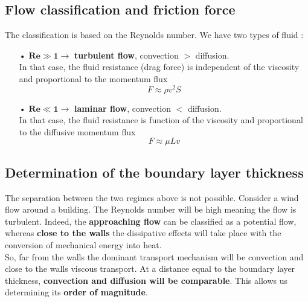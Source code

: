 \subsection{Flow classification and friction force}
The classification is based on the Reynolds number. We have two types of fluid : \\
	
\begin{itemize}
	\item[•] $\mathbf{Re \gg 1 \rightarrow}$ \textbf{turbulent flow}, convection $>$ diffusion. \\
	      In that case, the fluid resistance (drag force) is independent of the viscosity and proportional to the momentum flux 
	      \begin{equation}
	      	F \approx \rho v^2 S
	      \end{equation}
	      
	\item[•] $\mathbf{Re \ll 1 \rightarrow}$ \textbf{laminar flow}, convection $<$ diffusion. \\
	      In that case, the fluid resistance is function of the viscosity and proportional to the diffusive momentum flux
	      \begin{equation}
	      	F \approx \mu L v
	      \end{equation}
\end{itemize}
	
\subsection{Determination of the boundary layer thickness}
The separation between the two regimes above is not possible. Consider a wind flow around a building. The Reynolds number will be high meaning the flow is turbulent. Indeed, the \textbf{approaching flow} can be classified as a potential flow, whereas \textbf{close to the walls} the dissipative effects will take place with the conversion of mechanical energy into heat. \\
So, far from the walls the dominant transport mechanism will be convection and close to the walls viscous transport. At a distance equal to the boundary layer thickness, \textbf{convection and diffusion will be comparable}. This allows us determining its \textbf{order of magnitude}.
	
